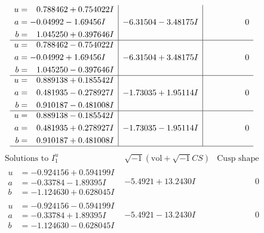 \documentclass[1p]{elsarticle_modified}
\theoremstyle{definition}
\newcommand{\I}{\sqrt{-1}}
\begin{document}
$$\begin{array}{c|c|c}
\begin{aligned}
u &= \phantom{-}0.788462 + 0.754022 I \\
a &= -0.04992 - 1.69456 I \\
b &= \phantom{-}1.045250 + 0.397646 I\end{aligned}
 & -6.31504 - 3.48175 I & \phantom{-0.000000 } 0 \\ \hline\begin{aligned}
u &= \phantom{-}0.788462 - 0.754022 I \\
a &= -0.04992 + 1.69456 I \\
b &= \phantom{-}1.045250 - 0.397646 I\end{aligned}
 & -6.31504 + 3.48175 I & \phantom{-0.000000 } 0 \\ \hline\begin{aligned}
u &= \phantom{-}0.889138 + 0.185542 I \\
a &= \phantom{-}0.481935 - 0.278927 I \\
b &= \phantom{-}0.910187 - 0.481008 I\end{aligned}
 & -1.73035 + 1.95114 I & \phantom{-0.000000 } 0 \\ \hline\begin{aligned}
u &= \phantom{-}0.889138 - 0.185542 I \\
a &= \phantom{-}0.481935 + 0.278927 I \\
b &= \phantom{-}0.910187 + 0.481008 I\end{aligned}
 & -1.73035 - 1.95114 I & \phantom{-0.000000 } 0\\
 \hline 
 \end{array}$$\newpage$$\begin{array}{c|c|c}  
\text{Solutions to }I^u_{1}& \I (\text{vol} + \sqrt{-1}CS) & \text{Cusp shape}\\
 \hline 
\begin{aligned}
u &= -0.924156 + 0.594199 I \\
a &= -0.33784 - 1.89395 I \\
b &= -1.124630 + 0.628045 I\end{aligned}
 & -5.4921 + 13.2430 I & \phantom{-0.000000 } 0 \\ \hline\begin{aligned}
u &= -0.924156 - 0.594199 I \\
a &= -0.33784 + 1.89395 I \\
b &= -1.124630 - 0.628045 I\end{aligned}
 & -5.4921 - 13.2430 I & \phantom{-0.000000 } 0 \\ \hline\begin{aligned}

\end{aligned}
\end{array}$$
\end{document}
